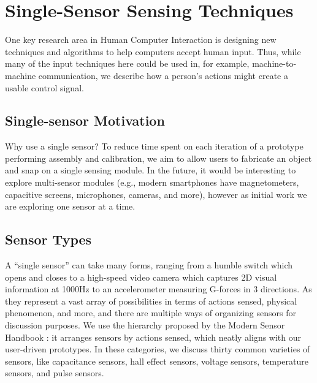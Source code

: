 \section{Single-Sensor Sensing Techniques}

One key research area in Human Computer Interaction is designing new techniques and algorithms to help computers accept human input. Thus, while many of the input techniques here could be used in, for example, machine-to-machine communication, we describe how a person's actions might create a usable control signal.

\subsection{Single-sensor Motivation}

Why use a single sensor? To reduce time spent on each iteration of a prototype performing assembly and calibration, we aim to allow users to fabricate an object and snap on a single sensing module. In the future, it would be interesting to explore multi-sensor modules (e.g., modern smartphones have magnetometers, capacitive screens, microphones, cameras, and more), however as initial work we are exploring one sensor at a time.

\subsection{Sensor Types}

A ``single sensor'' can take many forms, ranging from a humble switch which opens and closes to a high-speed video camera which captures 2D visual information at 1000Hz to an accelerometer measuring G-forces in 3 directions.
As they represent a vast array of possibilities in terms of actions sensed, physical phenomenon, and more, and there are multiple ways of organizing sensors for discussion purposes. We use the hierarchy proposed by the Modern Sensor Handbook \cite{citation needed!}: it arranges sensors by actions sensed, which neatly aligns with our user-driven prototypes. In these categories, we discuss thirty common varieties of sensors, like capacitance sensors, hall effect sensors, voltage sensors, temperature sensors, and pulse sensors.

